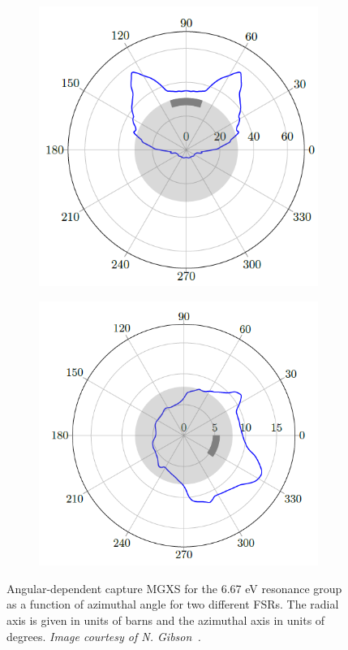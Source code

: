 \documentclass[12pt,twoside]{mitthesis-exec}
\begin{document}
\begin{figure}[h]
\begin{subfigure}{.5\textwidth}
  \centering
  \includegraphics[width=\linewidth]{figures/sph/batman-1}
  \caption{}
  \label{fig:chap6-batman-plots-a}
\end{subfigure}
\begin{subfigure}{.5\textwidth}
  \centering
  \includegraphics[width=\linewidth]{figures/sph/batman-2}
  \caption{}
  \label{fig:chap6-batman-plots-b}
\end{subfigure}
\caption[Angular-dependent capture MGXS]{Angular-dependent capture MGXS for the 6.67 eV resonance group as a function of azimuthal angle for two different FSRs. The radial axis is given in units of barns and the azimuthal axis in units of degrees. \textit{Image courtesy of N. Gibson~\cite{gibson2016thesis}.}}
\label{fig:batman-plots}
\end{figure}
\end{document}
